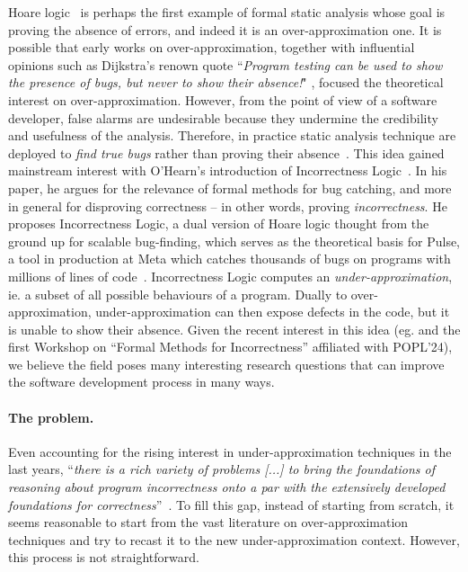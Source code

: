 Hoare logic~\cite{Hoare69} is perhaps the first example of formal static analysis whose goal is proving the absence of errors, and indeed it is an over-approximation one.
It is possible that early works on over-approximation, together with influential opinions such as Dijkstra's renown quote ``\textit{Program testing can be used to show the presence of bugs, but never to show their absence!}" \cite{EWD249}, focused the theoretical interest on over-approximation.
However, from the point of view of a software developer, false alarms are undesirable because they undermine the credibility and usefulness of the analysis. Therefore, in practice static analysis technique are deployed to \emph{find true bugs} rather than proving their absence~\cite{BKY05}.
This idea gained mainstream interest with O'Hearn's introduction of Incorrectness Logic~\cite{OHearn20}. In his paper, he argues for the relevance of formal methods for bug catching, and more in general for disproving correctness -- in other words, proving \emph{incorrectness}. He proposes Incorrectness Logic, a dual version of Hoare logic thought from the ground up for scalable bug-finding, which serves as the theoretical basis for Pulse, a tool in production at Meta which catches thousands of bugs on programs with millions of lines of code~\cite{DFLO19}.
Incorrectness Logic computes an \emph{under-approximation}, ie. a subset of all possible behaviours of a program. Dually to over-approximation, under-approximation can then expose defects in the code, but it is unable to show their absence.
Given the recent interest in this idea (eg. \cite{RBDDOV20,RBDO22,LRVBDO22,CZKON22,Cousot24} and the first Workshop on ``Formal Methods for Incorrectness'' affiliated with POPL'24), we believe the field poses many interesting research questions that can improve the software development process in many ways.

\paragraph*{The problem.}
Even accounting for the rising interest in under-approximation techniques in the last years, ``\textit{there is a rich variety of problems [...] to bring the foundations of reasoning about program incorrectness onto a par with the extensively developed foundations for correctness}''~\cite{OHearn20}. To fill this gap, instead of starting from scratch, it seems reasonable to start from the vast literature on over-approximation techniques and try to recast it to the new under-approximation context. However, this process is not straightforward.

